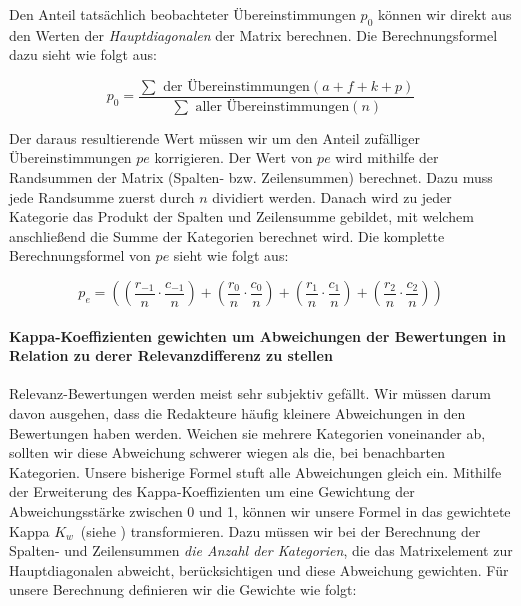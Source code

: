 Den Anteil tatsächlich beobachteter Übereinstimmungen $p_0$ können wir direkt aus den Werten der \textit{Hauptdiagonalen} der Matrix berechnen. Die Berechnungsformel dazu sieht wie folgt aus: 

\vspace{-1.5em}
\begin{equation}	
	p_0 = \frac{ \sum \text{ der Übereinstimmungen} \left( a + f + k + p \right)}{ \sum \text{ aller Übereinstimmungen} \left( n \right) }
\end{equation}
\vspace{-1em}

Der daraus resultierende Wert müssen wir um den Anteil zufälliger Übereinstimmungen $pe$ korrigieren. Der Wert von $pe$ wird mithilfe der Randsummen der Matrix (Spalten- bzw. Zeilensummen) berechnet. Dazu muss jede Randsumme zuerst durch $n$ dividiert werden. Danach wird zu jeder Kategorie das Produkt der Spalten und Zeilensumme gebildet, mit welchem anschließend die Summe der Kategorien berechnet wird. Die komplette Berechnungsformel von $pe$ sieht wie folgt aus:

\vspace{-1.5em}
\begin{equation}	
	p_e = \left(  \left(\frac{  r_{-1} }{ n } \cdot \frac{ c_{-1} }{ n } \right) +   \left(\frac{  r_0 }{ n } \cdot \frac{ c_0  }{ n } \right) +   \left(\frac{  r_1 }{ n } \cdot \frac{ c_1 }{ n } \right)  +  \left(\frac{ r_2 }{ n } \cdot \frac{   c_2 }{ n }\right) \right)
\end{equation}
\vspace{-2em}

\paragraph{Kappa-Koeffizienten gewichten um Abweichungen der Bewertungen in Relation zu derer Relevanzdifferenz zu stellen}
Relevanz-Bewertungen werden meist sehr subjektiv gefällt. Wir müssen darum davon ausgehen, dass die Redakteure häufig kleinere Abweichungen in den Bewertungen haben werden. Weichen sie mehrere Kategorien voneinander ab, sollten wir diese Abweichung schwerer wiegen als die, bei benachbarten Kategorien. Unsere bisherige Formel stuft alle Abweichungen gleich ein. Mithilfe der Erweiterung des Kappa-Koeffizienten um eine Gewichtung der Abweichungsstärke zwischen 0 und 1, können wir unsere Formel in das gewichtete Kappa $K_w$~(siehe \cite{KappaWerte}) transformieren. Dazu müssen wir bei der Berechnung der Spalten- und Zeilensummen \textit{die Anzahl der Kategorien}, die das Matrixelement zur Hauptdiagonalen abweicht, berücksichtigen und diese Abweichung gewichten. Für unsere Berechnung definieren wir die Gewichte wie folgt:

